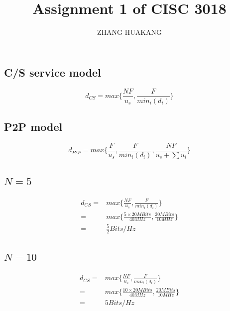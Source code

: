 \documentclass{article}
\title{Assignment 1 of CISC 3018}
\author{ZHANG HUAKANG}
\begin{document}
    \maketitle
    \section{}
        \subsection*{C/S service model}
        $$d_{CS}=max\{\frac{NF}{u_s},\frac{F}{{min}_i(d_i)}\}$$
        \subsection*{P2P model}
        $$d_{P2P}=max\{\frac{F}{u_s},\frac{F}{{min}_i(d_i)},\frac{NF}{u_s+\sum u_i}\}$$
        \subsection{}
            \subsection*{$N=5$}
                \begin{equation*}
                    \begin{split}
                        d_{CS}=&max\{\frac{NF}{u_s},\frac{F}{{min}_i(d_i)}\}\\
                            =&max\{\frac{5\times 20MBits}{40MHz},\frac{20MBits}{10MHz}\}\\
                            =&{\frac{5}{2}}{ Bits/Hz}
                    \end{split}
                \end{equation*}
            \subsection*{$N=10$}
                \begin{equation*}
                    \begin{split}
                        d_{CS}=&max\{\frac{NF}{u_s},\frac{F}{{min}_i(d_i)}\}\\
                            =&max\{\frac{10\times 20MBits}{40MHz},\frac{20MBits}{10MHz}\}\\
                            =&{5}{ Bits/Hz}
                    \end{split}
                \end{equation*}
\end{document}
